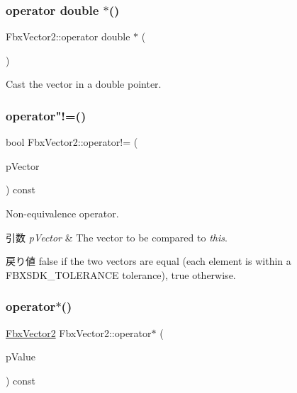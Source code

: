\subsubsection{\texorpdfstring{operator double $\ast$()}{operator double *()}}
{\footnotesize\ttfamily Fbx\+Vector2\+::operator double $\ast$ (\begin{DoxyParamCaption}{ }\end{DoxyParamCaption})}



Cast the vector in a double pointer. 

\mbox{\label{class_fbx_vector2_a9047e886e7588b3f46faf8949346833f}} 
\subsubsection{\texorpdfstring{operator"!=()}{operator!=()}}
{\footnotesize\ttfamily bool Fbx\+Vector2\+::operator!= (\begin{DoxyParamCaption}\item[{const \hyperlink{class_fbx_vector2}{Fbx\+Vector2} \&}]{p\+Vector }\end{DoxyParamCaption}) const}

Non-\/equivalence operator. 
\begin{DoxyParams}{引数}
{\em p\+Vector} & The vector to be compared to {\itshape this}. \\
\hline
\end{DoxyParams}
\begin{DoxyReturn}{戻り値}
{\ttfamily false} if the two vectors are equal (each element is within a F\+B\+X\+S\+D\+K\+\_\+\+T\+O\+L\+E\+R\+A\+N\+CE tolerance), {\ttfamily true} otherwise. 
\end{DoxyReturn}
\mbox{\label{class_fbx_vector2_aefff14b357c194d95d842ec09074d75d}} 
\subsubsection{\texorpdfstring{operator$\ast$()}{operator*()}\hspace{0.1cm}{\footnotesize\ttfamily [1/2]}}
{\footnotesize\ttfamily \hyperlink{class_fbx_vector2}{Fbx\+Vector2} Fbx\+Vector2\+::operator$\ast$ (\begin{DoxyParamCaption}\item[{double}]{p\+Value }\end{DoxyParamCaption}) const}

